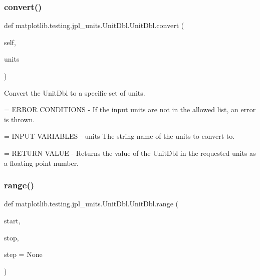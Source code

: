 \subsubsection{\texorpdfstring{convert()}{convert()}}
{\footnotesize\ttfamily def matplotlib.\+testing.\+jpl\+\_\+units.\+Unit\+Dbl.\+Unit\+Dbl.\+convert (\begin{DoxyParamCaption}\item[{}]{self,  }\item[{}]{units }\end{DoxyParamCaption})}

\begin{DoxyVerb}Convert the UnitDbl to a specific set of units.

= ERROR CONDITIONS
- If the input units are not in the allowed list, an error is thrown.

= INPUT VARIABLES
- units     The string name of the units to convert to.

= RETURN VALUE
- Returns the value of the UnitDbl in the requested units as a floating
  point number.
\end{DoxyVerb}
 \mbox{\label{classmatplotlib_1_1testing_1_1jpl__units_1_1UnitDbl_1_1UnitDbl_a84aea1f0b7fb4031ee623d2e77e6f2ed}} 
\subsubsection{\texorpdfstring{range()}{range()}}
{\footnotesize\ttfamily def matplotlib.\+testing.\+jpl\+\_\+units.\+Unit\+Dbl.\+Unit\+Dbl.\+range (\begin{DoxyParamCaption}\item[{}]{start,  }\item[{}]{stop,  }\item[{}]{step = {\ttfamily None} }\end{DoxyParamCaption})\hspace{0.3cm}{\ttfamily [static]}}

